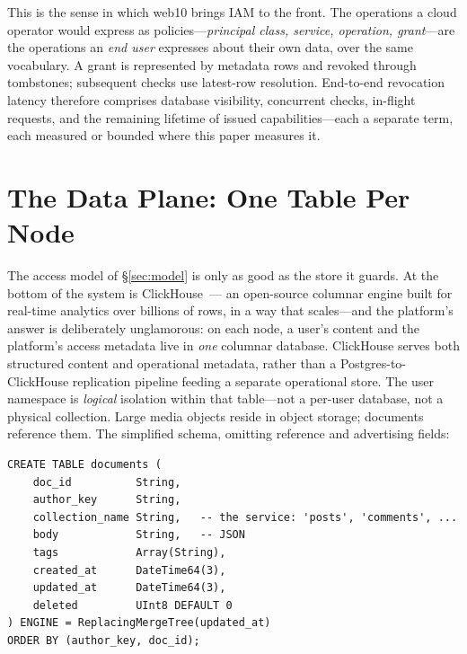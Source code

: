 \documentclass[sigconf, nonacm]{acmart}
\begin{document}
This is the sense in which web10 brings IAM to the front. The operations a
cloud operator would express as policies---\emph{principal class, service,
operation, grant}---are the operations an \emph{end user} expresses about
their own data, over the same vocabulary. A grant is represented by metadata
rows and revoked through tombstones; subsequent checks use latest-row
resolution. End-to-end revocation latency therefore comprises database
visibility, concurrent checks, in-flight requests, and the remaining
lifetime of issued capabilities---each a separate term, each measured or
bounded where this paper measures it.

\section{The Data Plane: One Table Per Node}
\label{sec:data}

The access model of \S\ref{sec:model} is only as good as the store it
guards. At the bottom of the system is ClickHouse~\cite{clickhouse2024}---
an open-source columnar engine built for real-time analytics over billions
of rows, in a way that scales---and the platform's answer is deliberately
unglamorous: on each node, a user's content and the platform's access
metadata live in \emph{one} columnar database. ClickHouse serves both
structured content and operational metadata, rather than a
Postgres-to-ClickHouse replication pipeline feeding a separate operational
store. The user namespace is \emph{logical} isolation within that
table---not a per-user database, not a physical collection. Large media
objects reside in object storage; documents reference them. The simplified
schema, omitting reference and advertising fields:

\begin{center}
\begin{minipage}{\columnwidth}
\begin{lstlisting}[style=sql]
CREATE TABLE documents (
    doc_id          String,
    author_key      String,
    collection_name String,   -- the service: 'posts', 'comments', ...
    body            String,   -- JSON
    tags            Array(String),
    created_at      DateTime64(3),
    updated_at      DateTime64(3),
    deleted         UInt8 DEFAULT 0
) ENGINE = ReplacingMergeTree(updated_at)
ORDER BY (author_key, doc_id);
\end{lstlisting}
\end{minipage}
\end{center}
\end{document}

